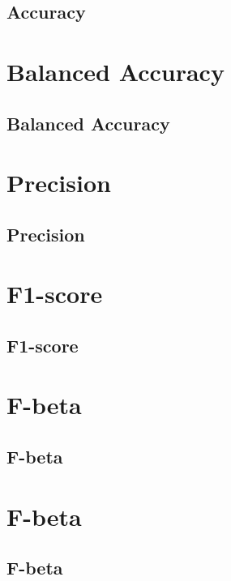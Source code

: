 \subsection{Accuracy}

\clearpage
\thispagestyle{customstyle}
\section{Balanced Accuracy}
\subsection{Balanced Accuracy}

\clearpage
\thispagestyle{customstyle}
\section{Precision}
\subsection{Precision}

\clearpage
\thispagestyle{customstyle}
\section{F1-score}
\subsection{F1-score}

\clearpage
\thispagestyle{customstyle}
\section{F-beta}
\subsection{F-beta}

\clearpage
\thispagestyle{customstyle}
\section{F-beta}
\subsection{F-beta}

